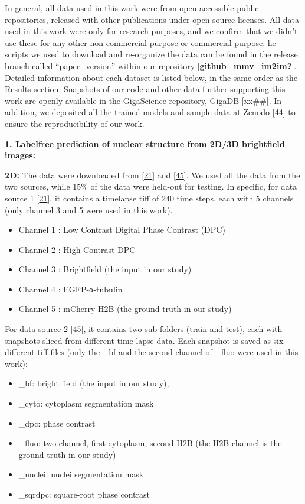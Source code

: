 In general, all data used in this work were from open-accessible public repositories, released with other publications under open-source licenses. All data used in this work were only for research purposes, and we confirm that we didn't use these for any other non-commercial purpose or commercial purpose. he scripts we used to download and re-organize the data can be found in the release branch called ``paper\_version'' within our repository {[}\protect\hyperlink{ref-github_mmv_im2im}{\textbf{github\_mmv\_im2im?}}{]}. Detailed information about each dataset is listed below, in the same order as the Results section. Snapshots of our code and other data further supporting this work are openly available in the GigaScience repository, GigaDB {[}xx\#\#{]}. In addition, we deposited all the trained models and sample data at Zenodo {[}\protect\hyperlink{ref-FBoj3fXM}{44}{]} to ensure the reproducibility of our work.

\textbf{1. Labelfree prediction of nuclear structure from 2D/3D brightfield images:}

\textbf{2D:} The data were downloaded from {[}\protect\hyperlink{ref-xv2VIyRP}{21}{]} and {[}\protect\hyperlink{ref-8ywSgqrJ}{45}{]}. We used all the data from the two sources, while 15\% of the data were held-out for testing. In specific, for data source 1 {[}\protect\hyperlink{ref-xv2VIyRP}{21}{]}, it contains a timelapse tiff of 240 time steps, each with 5 channels (only channel 3 and 5 were used in this work).

\begin{itemize}
\tightlist
\item
  Channel 1 : Low Contrast Digital Phase Contrast (DPC)
\item
  Channel 2 : High Contrast DPC
\item
  Channel 3 : Brightfield (the input in our study)
\item
  Channel 4 : EGFP-α-tubulin
\item
  Channel 5 : mCherry-H2B (the ground truth in our study)
\end{itemize}

For data source 2 {[}\protect\hyperlink{ref-8ywSgqrJ}{45}{]}, it contains two sub-folders (train and test), each with snapshots sliced from different time lapse data. Each snapshot is saved as six different tiff files (only the \_bf and the second channel of \_fluo were used in this work):

\begin{itemize}
\tightlist
\item
  \_bf: bright field (the input in our study),
\item
  \_cyto: cytoplasm segmentation mask
\item
  \_dpc: phase contrast
\item
  \_fluo: two channel, first cytoplasm, second H2B (the H2B channel is the ground truth in our study)
\item
  \_nuclei: nuclei segmentation mask
\item
  \_sqrdpc: square-root phase contrast
\end{itemize}

